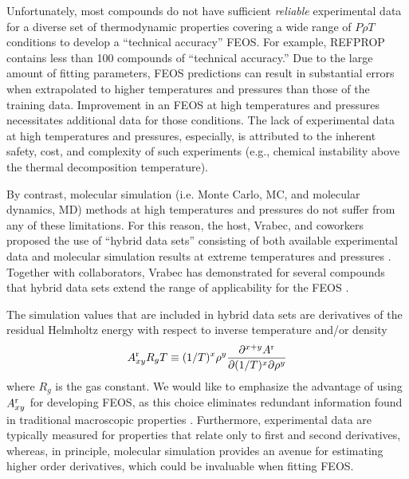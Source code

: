 \documentclass[12pt,a4paper]{article}
\begin{document}
Unfortunately, most compounds do not have sufficient \textit{reliable} experimental data for a diverse set of thermodynamic properties covering a wide range of $P \rho T$ conditions to develop a ``technical accuracy'' FEOS. For example, REFPROP contains less than 100 compounds of ``technical accuracy.'' Due to the large amount of fitting parameters, FEOS predictions can result in substantial errors when extrapolated to higher temperatures and pressures than those of the training data. Improvement in an FEOS at high temperatures and pressures necessitates additional data for those conditions. The lack of experimental data at high temperatures and pressures, especially, is attributed to the inherent safety, cost, and complexity of such experiments (e.g., chemical instability above the thermal decomposition temperature).

By contrast, molecular simulation (i.e. Monte Carlo, MC, and molecular dynamics, MD) methods at high temperatures and pressures do not suffer from any of these limitations. For this reason, the host, Vrabec, and coworkers proposed the use of ``hybrid data sets'' consisting of both available experimental data and molecular simulation results at extreme temperatures and pressures  \cite{Rutkai2013}. Together with collaborators, Vrabec has  demonstrated for several compounds that hybrid data sets extend the range of applicability for the FEOS \cite{Thol2016_siloxane_first,Thol2016_siloxane,Thol2017,Rutkai2013,Thol2015}. 

The simulation values that are included in hybrid data sets are derivatives of the residual Helmholtz energy with respect to inverse temperature and/or density
\begin{equation} \label{Residual Derivatives}
A_{xy}^{\rm r} R_gT \equiv (1/T)^x\rho^y \frac{\partial^{x+y}A^{\rm r}}{\partial(1/T)^x \partial \rho^y}
\end{equation}
where $R_g$ is the gas constant. We would like to emphasize the advantage of using $A_{xy}^{\rm r}$ for developing FEOS, as this choice eliminates redundant information found in traditional macroscopic properties \cite{Thol2016_LJ,Thol_LJTS,Rutkai2017,Lustig2015,Rutkai2013,Rutkai2015}. Furthermore, experimental data are typically measured for properties that relate only to first and second derivatives, whereas, in principle, molecular simulation provides an avenue for estimating higher order derivatives, which could be invaluable when fitting FEOS. 
\end{document}
